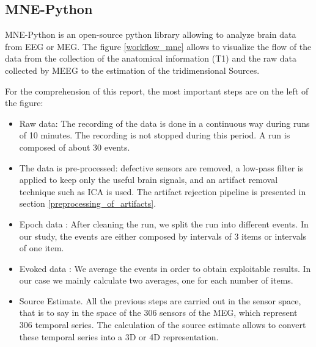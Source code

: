 \subsection{MNE-Python}

MNE-Python \cite{GramfortEtAl2013a} is an open-source python library allowing to analyze brain data from EEG or MEG. The figure \ref{workflow_mne} allows to visualize the flow of the data from the collection of the anatomical information (T1) and the raw data collected by MEEG to the estimation of the tridimensional Sources.

For the comprehension of this report, the most important steps are on the left of the figure:

\begin{itemize}
    \item Raw data: The recording of the data is done in a continuous way during runs of 10 minutes. The recording is not stopped during this period. A run is composed of about 30 events.
    \item The data is pre-processed: defective sensors are removed, a low-pass filter is applied to keep only the useful brain signals, and an artifact removal technique such as ICA is used. The artifact rejection pipeline is presented in section \ref{preprocessing_of_artifacts}. 
    \item Epoch data : After cleaning the run, we split the run into different events. In our study, the events are either composed by intervals of 3 items or intervals of one item.
    \item Evoked data : We average the events in order to obtain exploitable results. In our case we mainly calculate two averages, one for each number of items.
    \item Source Estimate. All the previous steps are carried out in the sensor space, that is to say in the space of the 306 sensors of the MEG, which represent 306 temporal series. The calculation of the source estimate allows to convert these temporal series into a 3D or 4D representation.
\end{itemize}

